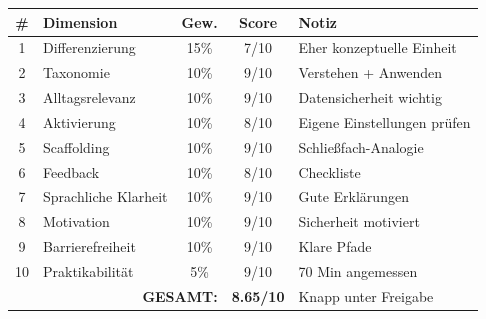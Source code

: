 \documentclass[11pt,a4paper]{article}
\begin{document}
\begin{scorebox}
\begin{tabular}{|c|l|c|c|p{3.5cm}|}
\hline
\# & Dimension & Gew. & Score & Notiz \\
\hline
1 & Differenzierung & 15\% & 7/10 & Eher konzeptuelle Einheit \\
2 & Taxonomie & 10\% & 9/10 & Verstehen + Anwenden \\
3 & Alltagsrelevanz & 10\% & 9/10 & Datensicherheit wichtig \\
4 & Aktivierung & 10\% & 8/10 & Eigene Einstellungen prüfen \\
5 & Scaffolding & 10\% & 9/10 & Schließfach-Analogie \\
6 & Feedback & 10\% & 8/10 & Checkliste \\
7 & Sprachliche Klarheit & 10\% & 9/10 & Gute Erklärungen \\
8 & Motivation & 10\% & 9/10 & Sicherheit motiviert \\
9 & Barrierefreiheit & 10\% & 9/10 & Klare Pfade \\
10 & Praktikabilität & 5\% & 9/10 & 70 Min angemessen \\
\hline
\multicolumn{3}{|r|}{\textbf{GESAMT:}} & \textbf{8.65/10} & Knapp unter Freigabe \\
\hline
\end{tabular}
\end{scorebox}
\end{document}
